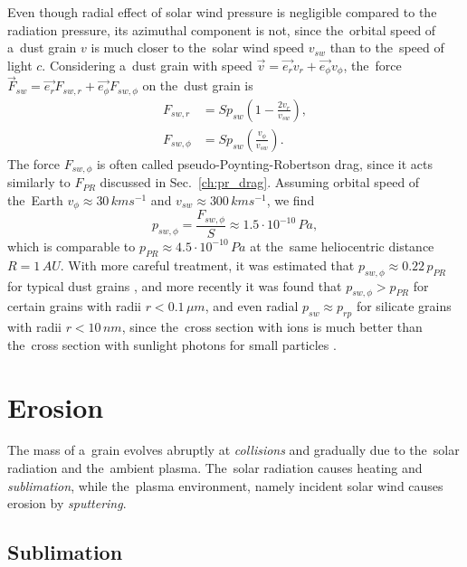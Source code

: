 Even though radial effect of solar wind pressure is negligible compared to the radiation pressure, its azimuthal component is not, since the~orbital speed of a~dust grain $v$ is much closer to the~solar wind speed $v_{sw}$ than to the~speed of light $c$. Considering a~dust grain with speed $\vec{v} = \vec{e_r}v_r + \vec{e_\phi}v_\phi$, the~force $\vec{F}_{sw} = \vec{e_r}F_{sw,r} + \vec{e_\phi}F_{sw,\phi}$ on the~dust grain is \citep{burns1979radiation}
\begin{equation}\begin{split}
    F_{sw,r} &= S p_{sw} \left( 1-\frac{2v_r}{v_{sw}} \right), \\
    F_{sw,\phi} &= S p_{sw} \left( \frac{v_\phi}{v_{sw}} \right).
\end{split}\end{equation}
The force $F_{sw,\phi}$ is often called pseudo-Poynting-Robertson drag, since it acts similarly to $F_{PR}$ discussed in Sec.~\ref{ch:pr_drag}. Assuming orbital speed of the~Earth $v_\phi \approx 30 \, \si{km s^{-1}}$ and $v_{sw} \approx 300 \, \si{km s^{-1}}$, we find 
\begin{equation}
    p_{sw,\phi} = \frac{F_{sw,\phi}}{S} \approx 1.5 \cdot 10^{-10} \, \si{Pa},
\end{equation}
which is comparable to $p_{PR} \approx 4.5 \cdot 10^{-10} \, \si{Pa}$ at the~same heliocentric distance $R = 1 \, \si{AU}$. With more careful treatment, it was estimated that $p_{sw,\phi} \approx 0.22 \, p_{PR}$ for typical dust grains \citep{whipple1967maintaining}, and more recently it was found that $p_{sw,\phi} > p_{PR}$ for certain grains with radii $r<0.1 \, \si{\mu m}$, and even radial $p_{sw} \approx p_{rp}$ for silicate grains with radii $r<10 \, \si{nm}$, since the~cross section with ions is much better than the~cross section with sunlight photons for small particles \citep{mukai1982solar}. 

\section{Erosion} \label{ch:erosion}

The mass of a~grain evolves abruptly at \textit{collisions} and gradually due to the~solar radiation and the~ambient plasma. The~solar radiation causes heating and \textit{sublimation}, while the~plasma environment, namely incident solar wind causes erosion by \textit{sputtering}. 

\subsection{Sublimation}

